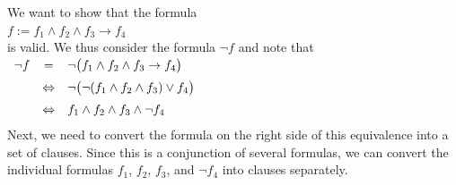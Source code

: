 We want to show that the formula 
\\[0.2cm]
\hspace*{1.3cm} 
$f := f_1 \wedge f_2 \wedge f_3 \rightarrow f_4$ 
\\[0.2cm]
is valid. We thus consider the formula $\neg f$ and note that \\[0.2cm]
\hspace*{1.3cm}
$
\begin{array}[t]{lcl}
  \neg f & =                & \neg\bigl(f_1 \wedge f_2 \wedge f_3       \rightarrow f_4 \bigr) \\[0.2cm]
         &  \Leftrightarrow & \neg\bigl(\neg(f_1 \wedge f_2 \wedge f_3) \vee        f_4 \bigr) \\[0.2cm]
         &  \Leftrightarrow & f_1 \wedge f_2 \wedge f_3 \wedge \neg f_4 \\[0.2cm]
\end{array}
$
\\[0.2cm]
Next, we need to convert the formula on the right side of this equivalence into a set of clauses.
Since this is a conjunction of several formulas, we can convert the individual formulas $f_1$, $f_2$, $f_3$,
and $\neg f_4$ into clauses separately. 

